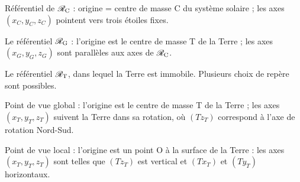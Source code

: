 \documentclass[12pt,fancy]{cours}
\begin{document}
\begin{liste}
\item Référentiel de  $\mathcal{R_{\rm{C}}}$ : origine = centre de masse C du système solaire ;  les axes $(x_C,y_C,z_C)$ pointent vers trois étoiles fixes.


\item  Le référentiel  $\mathcal{R}_{\rm{G}}$ : l’origine est le centre de masse T de la Terre ;  les axes $(x_G,y_G,z_G)$ sont parallèles aux axes de $\mathcal{R}_{\rm{C}}$. 




\item  Le référentiel  $\mathcal{R}_{\rm{T}}$, dans lequel la Terre est immobile. Plusieurs choix de repère sont possibles. 
\begin{liste}
  \item Point de vue global : l’origine est le centre de masse T de la Terre ; les axes $(x_T,y_T,z_T)$ suivent la Terre dans sa rotation, où $(Tz_T)$ correspond à l’axe de rotation Nord-Sud.
  \item Point de vue local : l’origine est un point O à la surface de la Terre : les axes $(x_T,y_T,z_T)$ sont telles que $(Tz_T)$ est vertical et $(Tx_T)$ et $(Ty_T)$ horizontaux.
\end{liste}



\end{liste}
\end{document}
